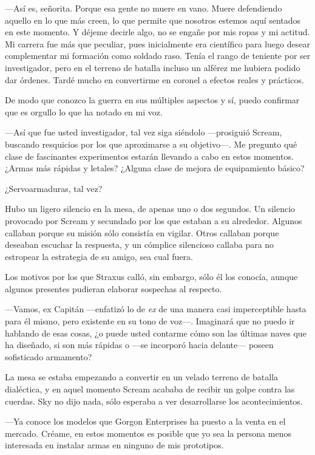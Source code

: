 ---Así es, señorita. Porque esa gente no muere en vano. Muere defendiendo aquello en lo que más creen, lo que permite que nosotros estemos aquí sentados en este momento. Y déjeme decirle algo, no se engañe por mis ropas y mi actitud. Mi carrera fue más que peculiar, pues inicialmente era científico para luego desear complementar mi formación como soldado raso. Tenía el rango de teniente por ser investigador, pero en el terreno de batalla incluso un alférez me hubiera podido dar órdenes. Tardé mucho en convertirme en coronel a efectos reales y prácticos.

\rquoti{}De modo que conozco la guerra en sus múltiples aspectos y sí, puedo confirmar que es orgullo lo que ha notado en mi voz.

---Así que fue usted investigador, tal vez siga siéndolo ---prosiguió Scream, buscando resquicios por los que aproximarse a su objetivo---. Me pregunto qué clase de fascinantes experimentos estarán llevando a cabo en estos momentos. ¿Armas más rápidas y letales? ¿Alguna clase de mejora de equipamiento básico?

\rquoti{}¿Servoarmaduras, tal vez?

Hubo un ligero silencio en la mesa, de apenas uno o dos segundos. Un silencio provocado por Scream y secundado por los que estaban a su alrededor. Algunos callaban porque su misión sólo consistía en vigilar. Otros callaban porque deseaban escuchar la respuesta, y un cómplice silencioso callaba para no estropear la estrategia de su amigo, sea cual fuera.

Los motivos por los que Straxus calló, sin embargo, sólo él los conocía, aunque algunos presentes pudieran elaborar sospechas al respecto.

---Vamos, ex Capitán ---enfatizó lo de \emph{ex} de una manera casi imperceptible hasta para él mismo, pero existente en su tono de voz---. Imaginará que no puedo ir hablando de esas cosas, ¿o puede usted contarme cómo son las últimas naves que ha diseñado, si son más rápidas o ---se incorporó hacia delante--- poseen sofisticado armamento?

La mesa se estaba empezando a convertir en un velado terreno de batalla dialéctica, y en aquel momento Scream acababa de recibir un golpe contra las cuerdas. Sky no dijo nada, sólo esperaba a ver desarrollarse los acontecimientos.

---Ya conoce los modelos que Gorgon Enterprises ha puesto a la venta en el mercado. Créame, en estos momentos es posible que yo sea la persona menos interesada en instalar armas en ninguno de mis prototipos.

